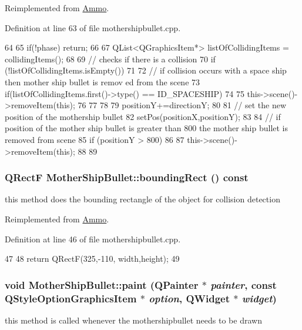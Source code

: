 Reimplemented from \hyperlink{class_ammo_a257fb0cdbb4302da65b89447fa6caeaa}{Ammo}.

Definition at line 63 of file mothershipbullet.cpp.


\begin{DoxyCode}
64 {
65     if(!phase) return;
66 
67     QList<QGraphicsItem*> listOfCollidingItems = collidingItems();
68 
69     // checks if there is a collision
70     if (!listOfCollidingItems.isEmpty())
71     {
72         // if collision occurs with a space ship then mother ship bullet is remov
      ed from the scene
73         if(listOfCollidingItems.first()->type() == ID_SPACESHIP)
74         {
75             this->scene()->removeItem(this);
76         }
77     }
78 
79     positionY+=directionY;
80 
81     // set the new position of the mothership bullet
82     setPos(positionX,positionY);
83 
84     // if position of the mother ship bullet is greater than 800 the mother ship 
      bullet is removed from scene
85     if (positionY > 800)
86     {
87         this->scene()->removeItem(this);
88     }
89 }
\end{DoxyCode}
\hypertarget{class_mother_ship_bullet_a994d08ae215b526f3bf8ccb63c6efabd}{
\subsubsection[{boundingRect}]{\setlength{\rightskip}{0pt plus 5cm}QRectF MotherShipBullet::boundingRect () const}}
\label{class_mother_ship_bullet_a994d08ae215b526f3bf8ccb63c6efabd}
this method does the bounding rectangle of the object for collision detection 

Reimplemented from \hyperlink{class_ammo_a4c5548e35a4599210f0599328ef03f01}{Ammo}.

Definition at line 46 of file mothershipbullet.cpp.


\begin{DoxyCode}
47 {
48   return QRectF(325,-110, width,height);
49 }
\end{DoxyCode}
\hypertarget{class_mother_ship_bullet_a931472c711d67537e8579ff36e6c5d0c}{
\subsubsection[{paint}]{\setlength{\rightskip}{0pt plus 5cm}void MotherShipBullet::paint (QPainter $\ast$ {\em painter}, \/  const QStyleOptionGraphicsItem $\ast$ {\em option}, \/  QWidget $\ast$ {\em widget})}}
\label{class_mother_ship_bullet_a931472c711d67537e8579ff36e6c5d0c}
this method is called whenever the mothershipbullet needs to be drawn 

